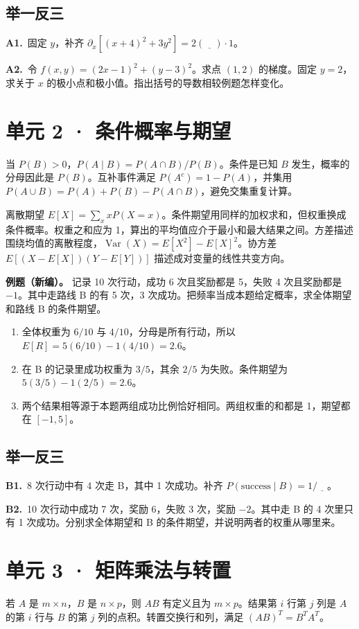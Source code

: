 \documentclass[UTF8,a4paper,11pt]{ctexart}
\newcommand{\CompactQuestion}[2]{\par\noindent\textbf{#1.}\ #2\par\vspace{.8em}}
\begin{document}
\subsection{举一反三}
\CompactQuestion{A1}{固定 $y$，补齐 $\partial_x[(x+4)^2+3y^2]=2(\underline{\quad})\cdot1$。}
\CompactQuestion{A2}{令 $f(x,y)=(2x-1)^2+(y-3)^2$。求点 $(1,2)$ 的梯度。固定 $y=2$，求关于 $x$ 的极小点和极小值。指出括号的导数相较例题怎样变化。}
\clearpage
\section{单元 2 · 条件概率与期望}
当 $P(B)>0$，$P(A\mid B)=P(A\cap B)/P(B)$。条件是已知 $B$ 发生，概率的分母因此是 $P(B)$。互补事件满足 $P(A^c)=1-P(A)$，并集用 $P(A\cup B)=P(A)+P(B)-P(A\cap B)$，避免交集重复计算。

离散期望 $E[X]=\sum_x xP(X=x)$。条件期望用同样的加权求和，但权重换成条件概率。权重之和应为 1，算出的平均值应介于最小和最大结果之间。方差描述围绕均值的离散程度，$\operatorname{Var}(X)=E[X^2]-E[X]^2$。协方差 $E[(X-E[X])(Y-E[Y])]$ 描述成对变量的线性共变方向。

\textbf{例题（新编）。} 记录 10 次行动，成功 6 次且奖励都是 5，失败 4 次且奖励都是 $-1$。其中走路线 B 的有 5 次，3 次成功。把频率当成本题给定概率，求全体期望和路线 B 的条件期望。

\begin{enumerate}
\item 全体权重为 $6/10$ 与 $4/10$，分母是所有行动，所以 $E[R]=5(6/10)-1(4/10)=2.6$。
\item 在 B 的记录里成功权重为 $3/5$，其余 $2/5$ 为失败。条件期望为 $5(3/5)-1(2/5)=2.6$。
\item 两个结果相等源于本题两组成功比例恰好相同。两组权重的和都是 1，期望都在 $[-1,5]$。
\end{enumerate}
\subsection{举一反三}
\CompactQuestion{B1}{8 次行动中有 4 次走 B，其中 1 次成功。补齐 $P(\mathrm{success}\mid B)=1/\underline{\quad}$。}
\CompactQuestion{B2}{10 次行动中成功 7 次，奖励 6，失败 3 次，奖励 $-2$。其中走 B 的 4 次里只有 1 次成功。分别求全体期望和 B 的条件期望，并说明两者的权重从哪里来。}
\clearpage
\section{单元 3 · 矩阵乘法与转置}
若 $A$ 是 $m\times n$，$B$ 是 $n\times p$，则 $AB$ 有定义且为 $m\times p$。结果第 $i$ 行第 $j$ 列是 $A$ 的第 $i$ 行与 $B$ 的第 $j$ 列的点积。转置交换行和列，满足 $(AB)^T=B^TA^T$。
\end{document}
